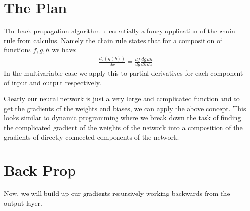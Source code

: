 \documentclass[12pt]{article}
\begin{document}
\section*{The Plan}
The back propagation algorithm is essentially a fancy application of
the chain rule from calculus. Namely the chain rule states that for a composition
of functions $f, g, h$ we have:
\begin{align*}
   \frac{df(g(h))} {dx} = \frac{df}{dg}\frac{dg}{dh}\frac{dh}{dx}
\end{align*}
In the multivariable case we apply this to partial derivatives for each component of input
and output respectively.


Clearly our neural network is just a very large and complicated function and to get the gradients
of the weights and biases, we can apply the above concept. This looks similar to dynamic programming
where we break down the task of finding the complicated gradient of the weights of the network
into a composition of the gradients of directly connected components of the network.

\section*{Back Prop}
Now, we will build up our gradients recursively working backwards from the output layer.
\end{document}
